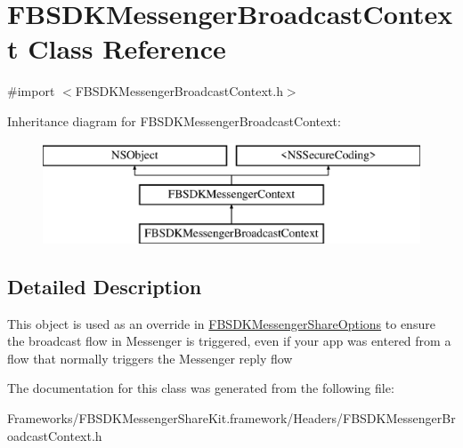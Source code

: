 \hypertarget{interface_f_b_s_d_k_messenger_broadcast_context}{}\section{F\+B\+S\+D\+K\+Messenger\+Broadcast\+Context Class Reference}
\label{interface_f_b_s_d_k_messenger_broadcast_context}


{\ttfamily \#import $<$F\+B\+S\+D\+K\+Messenger\+Broadcast\+Context.\+h$>$}

Inheritance diagram for F\+B\+S\+D\+K\+Messenger\+Broadcast\+Context\+:\begin{figure}[H]
\begin{center}
\leavevmode
\includegraphics[height=3.000000cm]{interface_f_b_s_d_k_messenger_broadcast_context}
\end{center}
\end{figure}


\subsection{Detailed Description}
This object is used as an override in \hyperlink{interface_f_b_s_d_k_messenger_share_options}{F\+B\+S\+D\+K\+Messenger\+Share\+Options} to ensure the broadcast flow in Messenger is triggered, even if your app was entered from a flow that normally triggers the Messenger reply flow 

The documentation for this class was generated from the following file\+:\begin{DoxyCompactItemize}
\item 
Frameworks/\+F\+B\+S\+D\+K\+Messenger\+Share\+Kit.\+framework/\+Headers/F\+B\+S\+D\+K\+Messenger\+Broadcast\+Context.\+h\end{DoxyCompactItemize}
